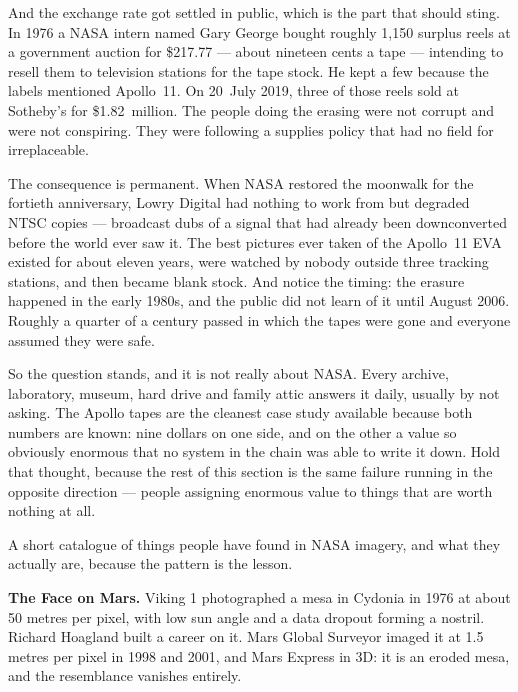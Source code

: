 And the exchange rate got settled in public, which is the part that should sting. In 1976 a NASA
intern named Gary George bought roughly 1{,}150 surplus reels at a government auction for \$217.77 ---
about nineteen cents a tape --- intending to resell them to television stations for the tape stock. He
kept a few because the labels mentioned Apollo~11. On 20~July 2019, three of those reels sold at
Sotheby's for \$1.82~million.  The people
doing the erasing were not corrupt and were not conspiring. They were following a supplies policy that
had no field for irreplaceable.

The consequence is permanent. When NASA restored the moonwalk for the fortieth anniversary, Lowry
Digital had nothing to work from but degraded NTSC copies --- broadcast dubs of a signal that had
already been downconverted before the world ever saw it. The best pictures ever taken of
the Apollo~11 EVA existed for about eleven years, were watched by nobody outside three tracking
stations, and then became blank stock. And notice the timing: the erasure happened in the early
1980s, and the public did not learn of it until August 2006. Roughly a quarter of a century passed in
which the tapes were gone and everyone assumed they were safe.

So the question stands, and it is not really about NASA.  Every archive, laboratory, museum, hard drive and family attic answers
it daily, usually by not asking. The Apollo tapes are the cleanest case study available because both
numbers are known: nine dollars on one side, and on the other a value so obviously enormous that no
system in the chain was able to write it down. Hold that thought, because the rest of this section is
the same failure running in the opposite direction --- people assigning enormous value to things that
are worth nothing at all.

A short catalogue of things people have found in NASA imagery, and what they actually are, because
the pattern is the lesson.

\textbf{The Face on Mars.} Viking 1 photographed a mesa in Cydonia in 1976 at about 50 metres per
pixel, with low sun angle and a data dropout forming a nostril. Richard Hoagland built a career on
it. Mars Global Surveyor imaged it at 1.5 metres per pixel in 1998 and 2001, and Mars Express in
3D: it is an eroded mesa, and the resemblance vanishes entirely.

